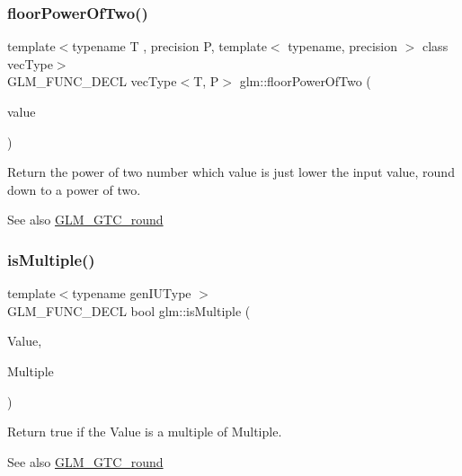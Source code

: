 \subsubsection{\texorpdfstring{floor\+Power\+Of\+Two()}{floorPowerOfTwo()}\hspace{0.1cm}{\footnotesize\ttfamily [2/2]}}
{\footnotesize\ttfamily template$<$typename T , precision P, template$<$ typename, precision $>$ class vec\+Type$>$ \\
G\+L\+M\+\_\+\+F\+U\+N\+C\+\_\+\+D\+E\+CL vec\+Type$<$T, P$>$ glm\+::floor\+Power\+Of\+Two (\begin{DoxyParamCaption}\item[{vec\+Type$<$ T, P $>$ const \&}]{value }\end{DoxyParamCaption})}

Return the power of two number which value is just lower the input value, round down to a power of two.

\begin{DoxySeeAlso}{See also}
\hyperlink{group__gtc__round}{G\+L\+M\+\_\+\+G\+T\+C\+\_\+round} 
\end{DoxySeeAlso}
\mbox{\label{group__gtc__round_gaf7444a7b2eb524f373463ceba76b9326}} 
\subsubsection{\texorpdfstring{is\+Multiple()}{isMultiple()}\hspace{0.1cm}{\footnotesize\ttfamily [1/3]}}
{\footnotesize\ttfamily template$<$typename gen\+I\+U\+Type $>$ \\
G\+L\+M\+\_\+\+F\+U\+N\+C\+\_\+\+D\+E\+CL bool glm\+::is\+Multiple (\begin{DoxyParamCaption}\item[{gen\+I\+U\+Type}]{Value,  }\item[{gen\+I\+U\+Type}]{Multiple }\end{DoxyParamCaption})}

Return true if the \textquotesingle{}Value\textquotesingle{} is a multiple of \textquotesingle{}Multiple\textquotesingle{}.

\begin{DoxySeeAlso}{See also}
\hyperlink{group__gtc__round}{G\+L\+M\+\_\+\+G\+T\+C\+\_\+round} 
\end{DoxySeeAlso}
\mbox{\label{group__gtc__round_ga50ea5d5dc33fffba39ad6002a3784123}} 
